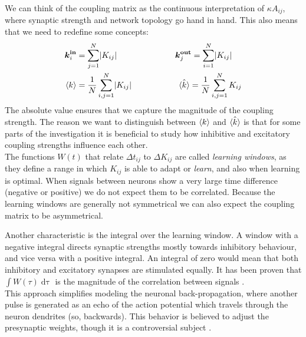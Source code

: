 We can think of the coupling matrix as the continuous interpretation of $\kappa A_{ij}$, where synaptic strength and network topology go hand in hand. This also means that we need to redefine some concepts:
\begin{alignat}{2}
\kinbi &= \sum_{j=1}^{N} \rvert K_{i j} \rvert &&\koutbj = \sum_{i=1}^{N} \rvert K_{i j} \rvert \label{eq:definekinkoutfromK} \\
\kmean &= \frac{1}{N} \sum_{i,j=1}^{N} \rvert K_{i j} \rvert \hspace{15mm} && \: \:\hat{\kmean} = \frac{1}{N} \sum_{i,j=1}^{N} K_{i j}  \label{eq:kmeanfromK} 
\end{alignat}
The absolute value ensures that we capture the magnitude of the coupling strength. The reason we want to distinguish between ${\langle k\rangle}$ and $\hat{{\langle k\rangle}}$ is that for some parts of the investigation it is beneficial to study how inhibitive and excitatory coupling strengths influence each other.\\

The functions $W(t)$ that relate $\Delta t_{ij}$ to $\Delta K_{ij}$ are called \textsl{learning windows},  as they define a range in which $K_{ij}$ is able to adapt or \textsl{learn}, and also when learning is optimal. When signals between neurons show a very large time difference (negative or positive) we do not expect them to be correlated. Because the learning windows are generally not symmetrical we can also expect the coupling matrix to be asymmetrical.

Another characteristic is the integral over the learning window. A window with a negative integral directs synaptic strengths mostly towards inhibitory behaviour, and vice versa with a positive integral. An integral of zero would mean that both inhibitory and excitatory synapses are stimulated equally. It has been proven that $\int W(\tau) \mathop{d\tau}$ is the magnitude of the correlation between signals \cite{Gerstner2002}. \\


This approach simplifies modeling the neuronal back-propagation, where another pulse is generated as an echo of the action potential which travels through the neuron dendrites (so, backwards). This behavior is believed to adjust the presynaptic weights, though it is a controversial subject \cite{Gerstner2002}. \\

